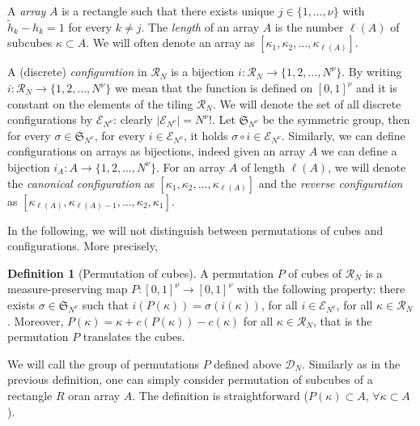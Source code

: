 \documentclass[12 pt]{article}
\theoremstyle{definition} \newtheorem{definition}{Definition}[section]
\theoremstyle{definition} \newtheorem{remark}[definition]{Remark}
\theoremstyle{plain} \newtheorem{lemma}[definition]{Lemma}
\theoremstyle{plain} \newtheorem{proposition}[definition]{Proposition}
\theoremstyle{plain} \newtheorem{theorem}[definition]{Theorem}
\theoremstyle{plain} \newtheorem{corollary}[definition]{Corollary}
\theoremstyle{definition} \newtheorem{example}[definition]{Example}
\theoremstyle{definition} \newtheorem{assumption}[definition]{Assumption}
\theoremstyle{definition} \newtheorem{conjecture}[definition]{Conjecture}
\newcommand{\1}{\mathbbm 1}
\numberwithin{equation}{section}
\begin{document}
 \medskip
 
 A \emph{array} $A$ is a rectangle such that there exists unique $j\in\lbrace 1,\dots,\nu\rbrace$ with $\tilde h_k- h_k=1$ for every $k\not = j$. The \emph{length} of an array $A$ is the number $\ell(A)$ of subcubes $\kappa\subset A$. We will often denote an array as $[\kappa_1,\kappa_2,\dots,\kappa_{\ell(A)}].$ 

 \medskip
 
 A (discrete) \emph{configuration} in $\mathcal R_N$ is a bijection $i:\mathcal R_N\rightarrow \lbrace 1,2,\dots,N^\nu\rbrace$. By writing $i:\mathcal{R}_N\rightarrow \lbrace 1,2,\dots,N^\nu\rbrace$ we mean that the function is defined on $[0,1]^\nu$ and it is constant on the elements of the tiling $\mathcal{R}_N$. We will denote the set of all discrete configurations by $\mathcal E_{N^\nu}$: clearly $|\mathcal E_{N^\nu}|=N^\nu!$. Let $\mathfrak S_{N^\nu}$ be the symmetric group, then for every $\sigma\in\mathfrak S_{N^\nu}$, for every $i\in \mathcal E_{N^\nu}$, it holds $\sigma\circ i \in \mathcal E_{N^\nu}$. Similarly, we can define configurations on arrays as bijections, indeed given an array $A$ we can define a bijection $i_A:A\rightarrow\lbrace 1,2,\dots,N^\nu\rbrace$.
  For an array $A$ of length $\ell(A)$, we will denote the \emph{canonical configuration} as $[\kappa_1,\kappa_2,\dots,\kappa_{\ell(A)}]$ and the \emph{reverse configuration} as $[\kappa_{\ell(A)},\kappa_{\ell(A)-1},\dots,\kappa_2,\kappa_1]$. 

 \medskip
 
 In the following, we will not distinguish between permutations of cubes and configurations. More precisely,
 
\begin{definition}[Permutation of cubes]\label{def:permutation:cubes}
  A permutation $P$ of cubes of $\mathcal{R}_N$ is a measure-preserving map $P:[0,1]^\nu\rightarrow [0,1]^\nu$ with the following property: there exists $\sigma\in\mathfrak{S}_{N^\nu}$ such that $i(P(\kappa))=\sigma(i(\kappa))$, for all $i\in\mathcal E_{N^\nu}$, for all $\kappa\in\mathcal{R}_N$. Moreover, $P(\kappa)=\kappa+ c(P(\kappa))-c(\kappa)$ for all $\kappa\in\mathcal{R}_N$, that is the permutation $P$ translates the cubes.
   \end{definition}
   We will call the group of permutations $P$ defined above $\mathcal{D}_N$. 
   Similarly as in the previous definition, one can simply consider permutation of subcubes of a rectangle $R$ oran array $A$. The definition is straightforward ($P(\kappa)\subset A$, $\forall\kappa\subset A$).
   \medskip
   
\end{document}

